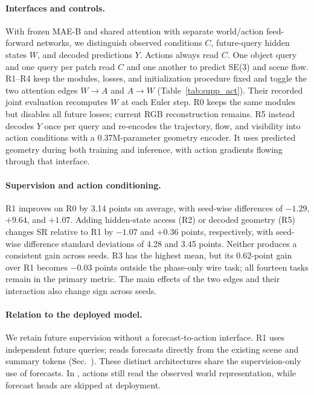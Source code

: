 \paragraph{Interfaces and controls.}
With frozen MAE-B and shared attention with separate world/action feed-forward
networks, we distinguish observed conditions $C$, future-query hidden states $W$,
and decoded predictions $Y$. Actions always read $C$. One object query and one
query per patch read $C$ and one another to predict SE(3) and scene flow.
R1--R4 keep the modules, losses, and initialization procedure fixed and toggle the
two attention edges $W\!\to\!A$ and $A\!\to\!W$
(Table~\ref{tab:supp_act}). Their recorded joint evaluation recomputes $W$ at each
Euler step. R0 keeps the same modules but disables all future losses; current RGB
reconstruction remains. R5 instead decodes $Y$ once per query and re-encodes the
trajectory, flow, and visibility into action conditions with a 0.37M-parameter
geometry encoder. It uses predicted geometry during both training and inference,
with action gradients flowing through that interface.

\paragraph{Supervision and action conditioning.}
R1 improves on R0 by 3.14 points on average, with seed-wise differences of
$-1.29$, $+9.64$, and $+1.07$. Adding hidden-state access (R2) or decoded geometry
(R5) changes SR relative to R1 by $-1.07$ and $+0.36$ points, respectively, with
seed-wise difference standard deviations of 4.28 and 3.45 points. Neither produces
a consistent gain across seeds. R3 has the highest mean, but its 0.62-point gain
over R1 becomes $-0.03$ points outside the phase-only wire task; all fourteen tasks
remain in the primary metric. The main effects of the two edges and their
interaction also change sign across seeds.

\paragraph{Relation to the deployed model.}
We retain future supervision without a forecast-to-action interface. R1 uses
independent future queries; \ours reads forecasts directly from the existing scene
and summary tokens (Sec.~). These distinct architectures share
the supervision-only use of forecasts. In \ours, actions still read the observed
world representation, while forecast heads are skipped at deployment.

